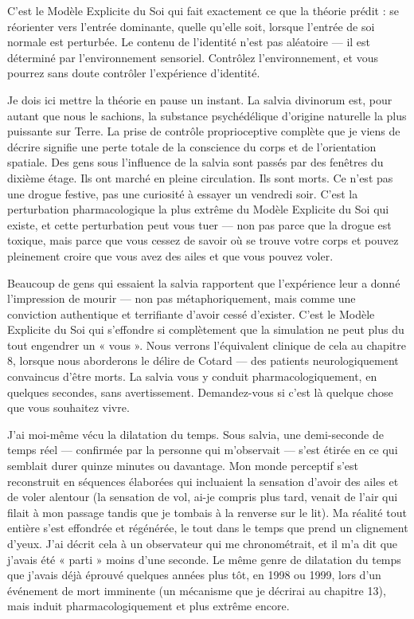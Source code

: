 \documentclass[11pt, twoside, openright]{book}
\begin{document}
C'est le Modèle Explicite du Soi qui fait exactement ce que la théorie prédit : se réorienter vers l'entrée dominante, quelle qu'elle soit, lorsque l'entrée de soi normale est perturbée. Le contenu de l'identité n'est pas aléatoire --- il est déterminé par l'environnement sensoriel. Contrôlez l'environnement, et vous pourrez sans doute contrôler l'expérience d'identité.

Je dois ici mettre la théorie en pause un instant. La salvia divinorum est, pour autant que nous le sachions, la substance psychédélique d'origine naturelle la plus puissante sur Terre. La prise de contrôle proprioceptive complète que je viens de décrire signifie une perte totale de la conscience du corps et de l'orientation spatiale. Des gens sous l'influence de la salvia sont passés par des fenêtres du dixième étage. Ils ont marché en pleine circulation. Ils sont morts. Ce n'est pas une drogue festive, pas une curiosité à essayer un vendredi soir. C'est la perturbation pharmacologique la plus extrême du Modèle Explicite du Soi qui existe, et cette perturbation peut vous tuer --- non pas parce que la drogue est toxique, mais parce que vous cessez de savoir où se trouve votre corps et pouvez pleinement croire que vous avez des ailes et que vous pouvez voler.

Beaucoup de gens qui essaient la salvia rapportent que l'expérience leur a donné l'impression de mourir --- non pas métaphoriquement, mais comme une conviction authentique et terrifiante d'avoir cessé d'exister. C'est le Modèle Explicite du Soi qui s'effondre si complètement que la simulation ne peut plus du tout engendrer un « vous ». Nous verrons l'équivalent clinique de cela au chapitre 8, lorsque nous aborderons le délire de Cotard --- des patients neurologiquement convaincus d'être morts. La salvia vous y conduit pharmacologiquement, en quelques secondes, sans avertissement. Demandez-vous si c'est là quelque chose que vous souhaitez vivre.

J'ai moi-même vécu la dilatation du temps. Sous salvia, une demi-seconde de temps réel --- confirmée par la personne qui m'observait --- s'est étirée en ce qui semblait durer quinze minutes ou davantage. Mon monde perceptif s'est reconstruit en séquences élaborées qui incluaient la sensation d'avoir des ailes et de voler alentour (la sensation de vol, ai-je compris plus tard, venait de l'air qui filait à mon passage tandis que je tombais à la renverse sur le lit). Ma réalité tout entière s'est effondrée et régénérée, le tout dans le temps que prend un clignement d'yeux. J'ai décrit cela à un observateur qui me chronométrait, et il m'a dit que j'avais été « parti » moins d'une seconde. Le même genre de dilatation du temps que j'avais déjà éprouvé quelques années plus tôt, en 1998 ou 1999, lors d'un événement de mort imminente (un mécanisme que je décrirai au chapitre 13), mais induit pharmacologiquement et plus extrême encore.
\end{document}
